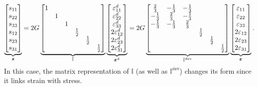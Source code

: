 \begin{gather}\label{eq:dev_tensor_se}
\underbrace{\begin{bmatrix}
s_{11}\\
s_{22}\\
s_{33}\\
s_{12}\\
s_{23}\\
s_{31}
\end{bmatrix}}_{\bm{s}}
=
2G\underbrace{\begin{bmatrix}
1&&&&&\\
&1&&&&\\
&&1&&&\\
&&&\frac{1}{2}&&\\
&&&&\frac{1}{2}&\\
&&&&&\frac{1}{2}
\end{bmatrix}}_{\mathbb{I}}
\underbrace{\begin{bmatrix}
\varepsilon^d_{11}\\
\varepsilon^d_{22}\\
\varepsilon^d_{33}\\
2\varepsilon^d_{12}\\
2\varepsilon^d_{23}\\
2\varepsilon^d_{31}
\end{bmatrix}}_{\bm{\varepsilon}^d}
=
2G\underbrace{\begin{bmatrix}
\frac{2}{3}&-\frac{1}{3}&-\frac{1}{3}&&&\\
-\frac{1}{3}&\frac{2}{3}&-\frac{1}{3}&&&\\
-\frac{1}{3}&-\frac{1}{3}&\frac{2}{3}&&&\\
&&&\frac{1}{2}&&\\
&&&&\frac{1}{2}&\\
&&&&&\frac{1}{2}
\end{bmatrix}}_{\mathbb{I^\text{dev}}}
\underbrace{\begin{bmatrix}
\varepsilon_{11}\\
\varepsilon_{22}\\
\varepsilon_{33}\\
2\varepsilon_{12}\\
2\varepsilon_{23}\\
2\varepsilon_{31}
\end{bmatrix}}_{\bm{\varepsilon}}.
\end{gather}
In this case, the matrix representation of $\mathbb{I}$ (as well as $\mathbb{I^\text{dev}}$) changes its form since it links strain with stress.

